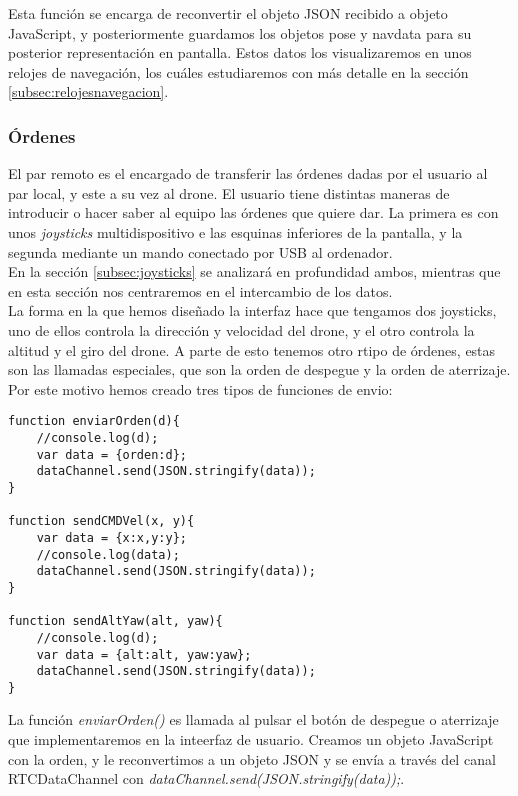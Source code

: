 Esta función se encarga de reconvertir el objeto JSON recibido a objeto JavaScript, y posteriormente guardamos los objetos pose y navdata para su posterior representación en pantalla. Estos datos los visualizaremos en unos relojes de navegación, los cuáles estudiaremos con más detalle en la sección \ref{subsec:relojesnavegacion}.\\


\subsubsection{Órdenes}\label{subsec:ordenes}

El par remoto es el encargado de transferir las órdenes dadas por el usuario al par local, y este a su vez al drone. El usuario tiene distintas maneras de introducir o hacer saber al equipo las órdenes que quiere dar. La primera es con unos \emph{joysticks} multidispositivo e las esquinas inferiores de la pantalla, y la segunda mediante un mando conectado por USB al ordenador.\\

En la sección \ref{subsec:joysticks} se analizará en profundidad ambos, mientras que en esta sección nos centraremos en el intercambio de los datos.\\

La forma en la que hemos diseñado la interfaz hace que tengamos dos joysticks, uno de ellos controla la dirección y velocidad del drone, y el otro controla la altitud y el giro del drone. A parte de esto tenemos otro rtipo de órdenes, estas son las llamadas especiales, que son la orden de despegue y la orden de aterrizaje. Por este motivo hemos creado tres tipos de funciones de envio:\\

\begin{lstlisting}[caption=Funciones de envío de órdenes en el par remoto.]
function enviarOrden(d){
    //console.log(d);
    var data = {orden:d};
    dataChannel.send(JSON.stringify(data));
}

function sendCMDVel(x, y){
    var data = {x:x,y:y};
    //console.log(data);
    dataChannel.send(JSON.stringify(data));
}

function sendAltYaw(alt, yaw){
    //console.log(d);
    var data = {alt:alt, yaw:yaw};
    dataChannel.send(JSON.stringify(data));
}
\end{lstlisting}

La función \emph{enviarOrden()} es llamada al pulsar el botón de despegue o aterrizaje que implementaremos en la inteerfaz de usuario. Creamos un objeto JavaScript con la orden, y le reconvertimos a un objeto JSON y se envía a través del canal RTCDataChannel con \emph{dataChannel.send(JSON.stringify(data));}.\\


